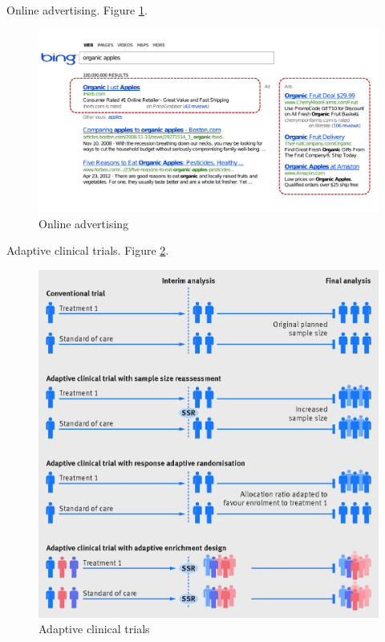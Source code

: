 \documentclass[english]{article}
\begin{document}
\item {Online advertising}. Figure \ref{online_ad}.
\begin{figure}[h!]
\begin{center}
\includegraphics[width=0.5\paperwidth]{online_ad}
    \caption{Online advertising}
    \label{online_ad}
\end{center}
\end{figure}



\item {Adaptive clinical trials}. Figure \ref{ada_ct}.
\begin{figure}[h!]
\begin{center}
\includegraphics[width=0.5\paperwidth]{ada}
    \caption{Adaptive clinical trials}
    \label{ada_ct}
\end{center}
\end{figure}
\end{document}
